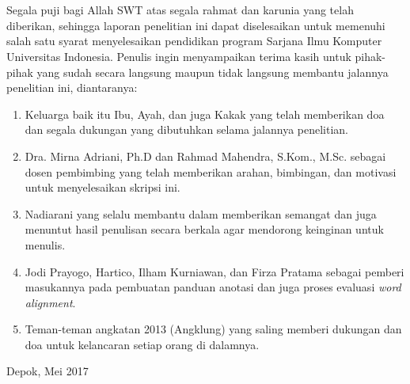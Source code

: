 \chapter*{\kataPengantar}

Segala puji bagi Allah SWT atas segala rahmat dan karunia yang telah diberikan, sehingga laporan penelitian ini dapat diselesaikan untuk memenuhi salah satu syarat menyelesaikan pendidikan program Sarjana Ilmu Komputer Universitas Indonesia. Penulis ingin menyampaikan terima kasih untuk pihak-pihak yang sudah secara langsung maupun tidak langsung membantu jalannya penelitian ini, diantaranya:

\begin{enumerate}
	\item Keluarga \saya baik itu Ibu, Ayah, dan juga Kakak yang telah memberikan doa dan segala dukungan yang dibutuhkan selama jalannya penelitian.
	\item Dra. Mirna Adriani, Ph.D dan Rahmad Mahendra, S.Kom., M.Sc. sebagai dosen pembimbing yang telah memberikan arahan, bimbingan, dan motivasi untuk menyelesaikan skripsi ini.
	\item Nadiarani yang selalu membantu dalam memberikan semangat dan juga menuntut hasil penulisan secara berkala agar mendorong keinginan untuk menulis.
	\item Jodi Prayogo, Hartico, Ilham Kurniawan, dan Firza Pratama sebagai pemberi masukannya pada pembuatan panduan anotasi dan juga proses evaluasi \textit{word alignment}.
	\item Teman-teman angkatan 2013 (Angklung) yang saling memberi dukungan dan doa untuk kelancaran setiap orang di dalamnya.
	
	
\end{enumerate}
\vspace*{0.1cm}
\begin{flushright}
	Depok, Mei 2017\\[0.1cm]
	\vspace*{1cm}
	\penulis
	
\end{flushright}